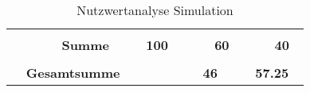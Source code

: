 \documentclass[main.tex]{subfiles} %
\begin{document}
\begin{table}[ht]
\begin{tabular}{|p{0.14\linewidth}|p{0.15\linewidth}|p{0.115\linewidth}|p{0.08\linewidth}|p{0.09\linewidth}|p{0.08\linewidth}|p{0.09\linewidth}|}
        \cline{2-7}
                                                           &                                     &                                              &                                                &             &            &             \\[-9pt]
                                                           & \textbf{Summe}                      & \textbf{100}                                 &                                                & \textbf{60} &            & \textbf{40} \\[1pt]
        \hline
        \hline
        \multicolumn{2}{|c|}{}                             &                                     & \multicolumn{2}{c|}{}                        & \multicolumn{2}{c|}{}                                                                   \\[-9pt]
        \multicolumn{2}{|c|}{\textbf{Gesamtsumme}}         &                                     & \multicolumn{2}{c|}{\textbf{46}}             & \multicolumn{2}{c|}{\textbf{57.25}}                                                     \\[1pt]
        \hline
    \end{tabular}
    \caption{Nutzwertanalyse Simulation}
\end{table}
\end{document}
